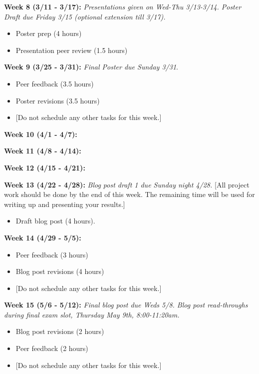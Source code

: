 \documentclass[
  letterpaper,
  DIV=11,
  numbers=noendperiod]{scrartcl}
\providecommand{\tightlist}{%
  \setlength{\itemsep}{0pt}\setlength{\parskip}{0pt}}\usepackage{longtable,booktabs,array}
\begin{document}
\textbf{Week 8 (3/11 - 3/17):} \emph{Presentations given on Wed-Thu
3/13-3/14. Poster Draft due Friday 3/15 (optional extension till 3/17).}

\begin{itemize}
\tightlist
\item
  Poster prep (4 hours)
\item
  Presentation peer review (1.5 hours)
\end{itemize}

\textbf{Week 9 (3/25 - 3/31):} \emph{Final Poster due Sunday 3/31}.

\begin{itemize}
\item
  Peer feedback (3.5 hours)
\item
  Poster revisions (3.5 hours)
\item
  {[}Do not schedule any other tasks for this week.{]}
\end{itemize}

\textbf{Week 10 (4/1 - 4/7):}

\textbf{Week 11 (4/8 - 4/14):}

\textbf{Week 12 (4/15 - 4/21):}

\textbf{Week 13 (4/22 - 4/28):} \emph{Blog post draft 1 due Sunday night
4/28.} {[}All project work should be done by the end of this week. The
remaining time will be used for writing up and presenting your
results.{]}

\begin{itemize}
\tightlist
\item
  Draft blog post (4 hours).
\end{itemize}

\textbf{Week 14 (4/29 - 5/5):}

\begin{itemize}
\tightlist
\item
  Peer feedback (3 hours)
\item
  Blog post revisions (4 hours)
\item
  {[}Do not schedule any other tasks for this week.{]}
\end{itemize}

\textbf{Week 15 (5/6 - 5/12):} \emph{Final blog post due Weds 5/8. Blog
post read-throughs during final exam slot, Thursday May 9th,
8:00-11:20am.}

\begin{itemize}
\tightlist
\item
  Blog post revisions (2 hours)
\item
  Peer feedback (2 hours)
\item
  {[}Do not schedule any other tasks for this week.{]}
\end{itemize}
\end{document}
